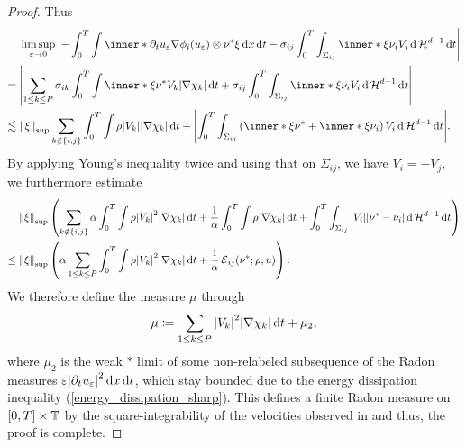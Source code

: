 \begin{proof}
	Thus
	\begin{align*}
		& \limsup_{ \varepsilon \to 0 }
			\abs{
				- \int_{ 0 }^{ T }
					\int
						\inner*{ \partial_{ t } u_{ 
								\varepsilon } }{ \nabla \phi_{ i } ( u_{ 
								\varepsilon } ) 
						\otimes \nu^{ \ast } \xi }
					\dd{ x }
				\dd{ t }
				-
				\sigma_{ i j }
				\int_{ 0 }^{ T }
					\int_{ \Sigma_{ i j } }
						\inner*{ \xi }{ \nu_{ i } }
						V_{ i } 	
					\dd{ \hm^{ d - 1 } }
				\dd{ t }
			}
		\\
		={} &
		\abs{
			\sum_{ 1 \leq k \leq P }
				\sigma_{ i k }
				\int_{ 0 }^{ T }
					\int
						\inner*{ \xi }{ \nu^{ \ast } }
						V_{ k }
					\abs{ \nabla \chi_{ k } }
				\dd{ t }
			+
			\sigma_{ i j }
			\int_{ 0 }^{ T }
				\int_{ \Sigma_{ i j } }
					\inner*{ \xi }{ \nu_{ i } }
					V_{ i }
				\dd{ \hm^{ d - 1 } }
			\dd{ t }
		}
		\\
		\lesssim{} &
		\norm{ \xi }_{ \mathrm{sup} }
		\sum_{ k \notin \{ i , j \} }
			\int_{ 0 }^{ T }
				\int
					\rho
					\abs{ V_{ k } }
				\abs{ \nabla \chi_{ k } }
			\dd{ t }
		+
		\abs{
			\int_{ 0 }^{ T }
				\int_{ \Sigma_{ i j } }
					\left(
						\inner*{ \xi }{ \nu^{ \ast } }
						+
						\inner*{ \xi }{ \nu_{ i } }
					\right)
					V_{ i }
				\dd{ \hm^{ d -1 } }
			\dd{ t }
		}.
	\end{align*}
	By applying Young's inequality twice and using that on $ \Sigma_{ i j } 
	$, we have $ V_{ 
	i } = - V_{ j } $, we furthermore estimate
	\begin{align*}
		& \norm{ \xi }_{ \mathrm{sup} }
		\left(
			\sum_{ k \notin \{ i , j \} }
				\alpha 
				\int_{ 0 }^{ T }
					\int
						\rho
						\abs{ V_{ k } }^{ 2 }
					\abs{ \nabla \chi_{ k } }
				\dd{ t }
				+
				\frac{ 1 }{ \alpha }
				\int_{ 0 }^{ T }
					\int
						\rho
					\abs{ \nabla \chi_{ k } }
				\dd{ t }
			+
			\int_{ 0 }^{ T }
				\int_{ \Sigma_{ i j } }
					\abs{ V_{ i } }
					\abs{ \nu^{ \ast } - \nu_{ i } }
				\dd{ \hm^{ d - 1 } }
			\dd{ t }
		\right)
		\\
		\leq{} &
		\norm{ \xi }_{\mathrm{sup} }
		\left(
			\alpha
			\sum_{ 1 \leq k \leq P }
				\int_{ 0 }^{ T }
					\int
						\rho
						\abs{ V_{ k } }^{ 2 }
					\abs{ \nabla \chi_{ k } }
				\dd{ t}
			+
			\frac{ 1 }{ \alpha }
			\tilt_excess_{ i j } ( \nu^{ \ast } ; \rho , u )
		\right).
	\end{align*}
	We therefore define the measure $ \mu $ through
	\begin{equation*}
		\mu
		\coloneqq
		\sum_{ 1 \leq k \leq P }
			\abs{ V_{ k } }^{ 2 }
			\abs{ \nabla \chi_{ k } }
			\dd{ t }
		+
		\mu_{ 2 },
	\end{equation*}
	where $ \mu_{ 2 } $ is the weak $ \ast $ limit of some non-relabeled 
	subsequence of the Radon measures $ \varepsilon \abs{ \partial_{ t } u_{ 
	\varepsilon } }^{ 2 } \dd{ x } \dd{ t } $, which stay bounded due to the 
	energy dissipation inequality (\ref{energy_dissipation_sharp}).
	This defines a finite Radon measure on $ [ 0 , T ] \times \operatorname{\mathbb{T}} $ by 
	the square-integrability of the velocities observed in 
	 and 
	thus, the proof is complete.
\end{proof}

